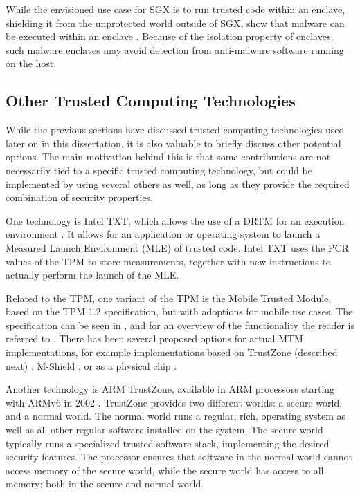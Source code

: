 While the envisioned use case for SGX is to run trusted code within an enclave, shielding it from the unprotected world outside of SGX, \citeauthor{schwarz:2019} show that malware can be executed within an enclave \cite{schwarz:2019}.
Because of the isolation property of enclaves, such malware enclaves may avoid detection from anti-malware software running on the host.


\subsection{Other Trusted Computing Technologies}
\label{sec:kappa-othertc}

While the previous sections have discussed trusted computing technologies used later on in this dissertation, it is also valuable to briefly discuss other potential options.
The main motivation behind this is that some contributions are not necessarily tied to a specific trusted computing technology, but could be implemented by using several others as well, as long as they provide the required combination of security properties.

One technology is Intel TXT, which allows the use of a DRTM for an execution environment \cite{TXT-mle}.
It allows for an application or operating system to launch a Measured Launch Environment (MLE) of trusted code.
Intel TXT uses the PCR values of the TPM to store measurements, together with new instructions to actually perform the launch of the MLE.

Related to the TPM, one variant of the TPM is the Mobile Trusted Module, based on the TPM 1.2 specification, but with adoptions for mobile use cases.
The specification can be seen in \cite{MTM1.0spec}, and for an overview of the functionality the reader is referred to \cite{ekberg:2007}.
There has been several proposed options for actual MTM implementations, for example implementations based on TrustZone (described next) \cite{winter:2008}, M-Shield \cite{ekberg:2009}, or as a physical chip \cite{kim:2010}.

Another technology is ARM TrustZone, available in ARM processors starting with ARMv6 in 2002 \cite{zhang:2016}.
TrustZone provides two different worlds: a secure world, and a normal world.
The normal world runs a regular, rich, operating system as well as all other regular software installed on the system.
The secure world typically runs a specialized trusted software stack, implementing the desired security features.
The processor ensures that software in the normal world cannot access memory of the secure world, while the secure world has access to all memory: both in the secure and normal world.

